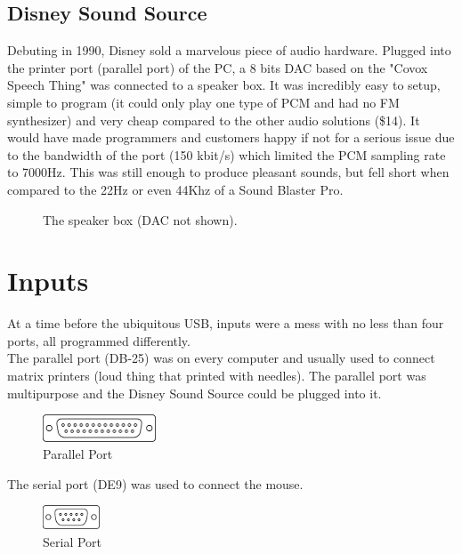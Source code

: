 \documentclass[book.tex]{subfiles}
\begin{document}
  \subsection{Disney Sound Source}
  Debuting in 1990, Disney sold a marvelous piece of audio hardware. Plugged into the printer port (parallel port) of the PC, a 8 bits DAC based on the "Covox Speech Thing" was connected to a speaker box. It was incredibly easy to setup, simple to program (it could only play one type of PCM and had no FM synthesizer) and very cheap compared to the other audio solutions (\$14). It would have made programmers and customers happy if not for a serious issue due to the bandwidth of the port (150 kbit/s) which limited the PCM sampling rate to 7000Hz.  This was still enough to produce pleasant sounds, but fell short when compared to the 22Hz or even 44Khz of a Sound Blaster Pro.
  \par
  \begin{figure}[H] 
    \centering 
    \caption{The speaker box (DAC not shown).}
  \end{figure}








\section{Inputs}
At a time before the ubiquitous USB, inputs were a mess with no less than four ports, all programmed differently.\\

The parallel port (DB-25) was on every computer and usually used to connect matrix printers (loud thing that printed with needles). The parallel port was multipurpose and the Disney Sound Source could be plugged into it.\\
\par
 \begin{figure}[H]
\centering
\includegraphics[width=0.3\textwidth]{imgs/drawings/ports/DB-25_parallel_port.eps}
\caption{Parallel Port}
\label{fig:parallelPort}
\end{figure}


The serial port (DE9) was used to connect the mouse.
 \begin{figure}[H]
\centering
\includegraphics[width=0.15\textwidth]{imgs/drawings/ports/DE9_serial_port.eps}
\caption{Serial Port}
\label{fig:serialPort}
\end{figure}
\end{document}
